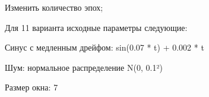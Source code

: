 \documentclass{article}%
\begin{document}
\begin{flushleft}%
Изменить количество эпох;%
%
\end{flushleft}%
\begin{flushleft}%
Для 11 варианта исходные параметры следующие:%
%
\end{flushleft}%
\begin{flushleft}%
Синус с медленным дрейфом: sin(0.07 * t) + 0.002 * t%
%
\end{flushleft}%
\begin{flushleft}%
 Шум: нормальное распределение N(0, 0.1²)%
%
\end{flushleft}%
\begin{flushleft}%
 Размер окна: 7%
%
\end{flushleft}%
\end{document}
